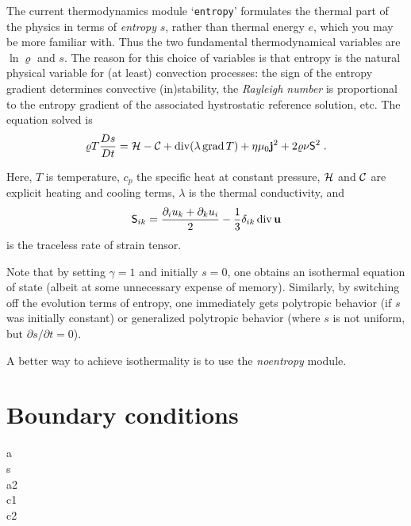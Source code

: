 \documentclass[12pt,twoside,notitlepage,a4paper]{article}
\newcommand{\file}[1]{`\texttt{#1}'}
\newcommand{\name}[1]{\textsl{#1}\index{#1}\/}
\newcommand{\grad}    {\mathop{\rm grad}\nolimits}
\newcommand{\Div}     {\mathop{\rm div}\nolimits}
\newcommand{\vekt}[1] {\mathbf{#1}}
\newcommand{\Cool}          {{\cal C}}
\newcommand{\Heat}          {{\cal H}}
\newcommand{\jv}            {\vekt{j}}
\newcommand{\uv}            {\vekt{u}}
\begin{document}
The current thermodynamics module \file{entropy} formulates the thermal
part of the physics in terms of \emph{entropy} $s$, rather than thermal
energy $e$, which you may be more familiar with.
Thus the two fundamental thermodynamical variables are $\ln\varrho$
and $s$.
The reason for this choice of variables is that entropy is the natural
physical variable for (at least) convection processes: the sign of the
entropy gradient determines convective (in)stability, the
\emph{Rayleigh number} is proportional to the entropy gradient
of the associated hystrostatic reference solution, etc.
The equation solved is
\begin{equation}
  \varrho T\frac{Ds}{Dt}
   =  \Heat - \Cool
      + \Div(\lambda\grad T)
      + \eta\mu_0 \jv^2
      + 2\varrho\nu {\sf S}^2 \; .
\end{equation}

Here, $T$ is temperature, $c_p$ the specific heat at constant pressure,
$\Heat$ and $\Cool$ are explicit heating and cooling terms,
$\lambda$ is the thermal conductivity, and
\begin{equation}
  {\sf S}_{ik} = \frac{\partial_i u_k + \partial_k u_i}{2}
                 -\frac{1}{3} \delta_{ik}\Div\uv
\end{equation}
is the traceless rate of strain tensor.

\bigskip

Note that by setting $\gamma=1$ and initially $s=0$, one obtains an
isothermal equation of state (albeit at some unnecessary expense of
memory).
Similarly, by switching off the evolution terms of entropy, one immediately
gets polytropic behavior (if $s$ was initially constant) or generalized
polytropic behavior
(where $s$ is not uniform, but $\partial s/\partial t = 0$).

A better way to achieve isothermality is to use the \name{noentropy}
module.



\section{Boundary conditions}

\begin{description}
\item[a]
\item[s]
\item[a2]
\item[c1]
\item[c2]
\end{description}
\end{document}
